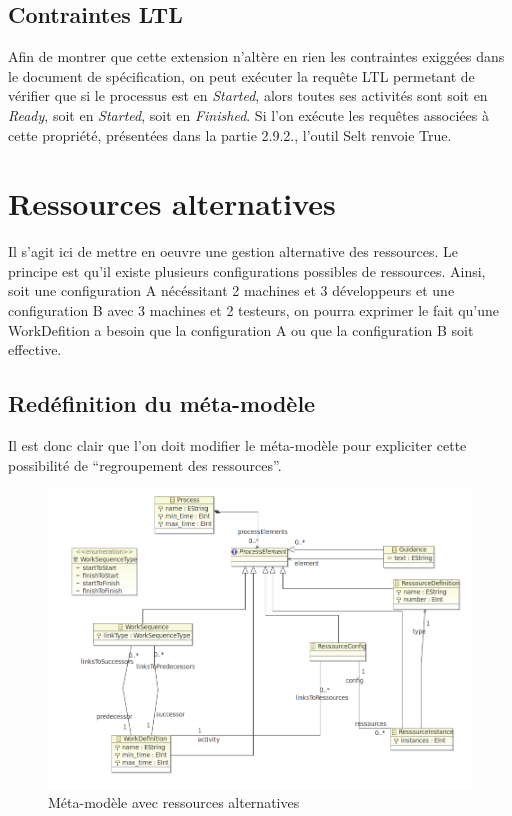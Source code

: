 \newpage

\subsection{Contraintes LTL}

Afin de montrer que cette extension n'altère en rien les contraintes exiggées dans le document de spécification, on peut exécuter la requête LTL permetant de vérifier que si le processus est en \textit{Started}, alors toutes ses activités sont soit en \textit{Ready}, soit en \textit{Started}, soit en \textit{Finished}. Si l'on exécute les requêtes associées à cette propriété, présentées dans la partie 2.9.2., l'outil Selt renvoie True.

\section{Ressources alternatives}

Il s'agit ici de mettre en oeuvre une gestion alternative des ressources. Le principe est qu'il existe plusieurs configurations possibles de ressources.
Ainsi, soit une configuration A nécéssitant 2 machines et 3 développeurs et une configuration B avec 3 machines et 2 testeurs, on pourra exprimer le fait qu'une WorkDefition a besoin que la configuration A ou que la configuration B soit effective.

\subsection{Redéfinition du méta-modèle}

Il est donc clair que l'on doit modifier le méta-modèle pour expliciter cette possibilité de ``regroupement des ressources''.

\begin{figure}[!h] 
\begin{center}
\includegraphics[width=15cm]{Capture-13.png}
\caption{Méta-modèle avec ressources alternatives} 
\label{img1} 
\end{center}
\end{figure} 

